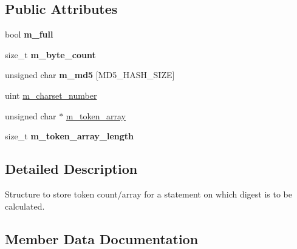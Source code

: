 \subsection*{Public Attributes}
\begin{DoxyCompactItemize}
\item 
\mbox{\label{structsql__digest__storage_a82e0700698c63f0ad694c88c3de7d6e3}} 
bool {\bfseries m\+\_\+full}
\item 
\mbox{\label{structsql__digest__storage_a5425b83fb1a86072acbfa50a6a0059fc}} 
size\+\_\+t {\bfseries m\+\_\+byte\+\_\+count}
\item 
\mbox{\label{structsql__digest__storage_a1cc109255ed46294669b6f6f57730b90}} 
unsigned char {\bfseries m\+\_\+md5} \mbox{[}M\+D5\+\_\+\+H\+A\+S\+H\+\_\+\+S\+I\+ZE\mbox{]}
\item 
uint \mbox{\hyperlink{structsql__digest__storage_a28b02737e5a7cd2d7d3a7789fcfe82f2}{m\+\_\+charset\+\_\+number}}
\item 
unsigned char $\ast$ \mbox{\hyperlink{structsql__digest__storage_ab295f51157fe09403347b5a329c9becd}{m\+\_\+token\+\_\+array}}
\item 
\mbox{\label{structsql__digest__storage_aff9d69ef4240227f3faa4102a693f177}} 
size\+\_\+t {\bfseries m\+\_\+token\+\_\+array\+\_\+length}
\end{DoxyCompactItemize}


\subsection{Detailed Description}
Structure to store token count/array for a statement on which digest is to be calculated. 

\subsection{Member Data Documentation}
\mbox{\label{structsql__digest__storage_a28b02737e5a7cd2d7d3a7789fcfe82f2}} 
